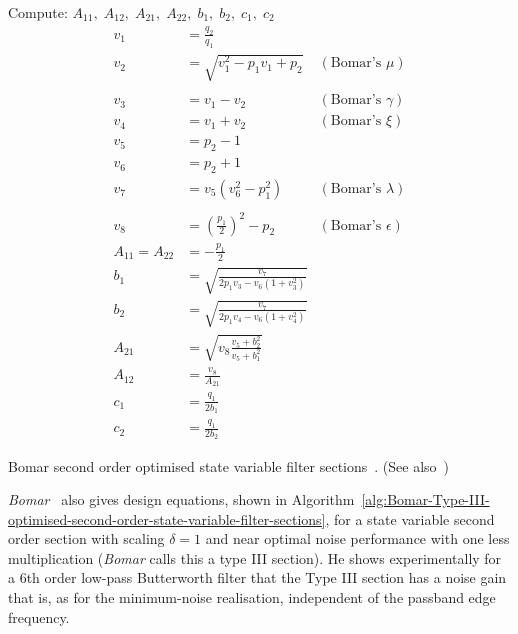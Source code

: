 \documentclass[a4paper,twoside,10pt,english]{report}
\begin{document}
\begin{algorithm}[!htpb]
Compute: $A_{11},\;A_{12},\;A_{21},\;A_{22},\;b_{1},\;b_{2},\;c_{1},\;c_{2}$
\begin{align*}
v_{1} &= \frac{q_{2}}{q_{1}}\\
v_{2} &= \sqrt{v_{1}^{2}-p_{1}v_{1}+p_{2}} & \left(\text{Bomar's }\mu\right)\\\\
v_{3} &= v_{1}-v_{2} & \left(\text{Bomar's }\gamma\right)\\
v_{4} &= v_{1}+v_{2} & \left(\text{Bomar's }\xi\right)\\
v_{5} &= p_{2}-1\\
v_{6} &= p_{2}+1\\
v_{7} &= v_{5}\left(v_{6}^{2}-p_{1}^{2}\right)
       & \left(\text{Bomar's }\lambda\right)\\\\
v_{8} &= \left(\frac{p_{1}}{2}\right)^{2}-p_{2}
      & \left(\text{Bomar's }\epsilon\right)\\
A_{11} = A_{22} &= -\frac{p_{1}}{2}\\
b_{1} &= \sqrt{\frac{v_{7}}{2p_{1}v_{3}-v_{6}\left(1+v_{3}^{2}\right)}}\\
b_{2} &= \sqrt{\frac{v_{7}}{2p_{1}v_{4}-v_{6}\left(1+v_{4}^{2}\right)}}\\
A_{21} &= \sqrt{v_{8}\frac{v_{5}+b_{2}^{2}}{v_{5}+b_{1}^{2}}}\\
A_{12} &= \frac{v_{8}}{A_{21}}\\
c_{1} &= \frac{q_{1}}{2b_{1}}\\
c_{2} &= \frac{q_{1}}{2b_{2}}
\end{align*}
\caption{Bomar second order optimised state variable filter sections~\cite[Equation 17]{Bomar_NewSecondOrderStateSpaceStructures}. (See also~\cite[Figure 9.12.1]{RobertsMullis_DigitalSignalProcessing})}
\label{alg:Bomar-optimised-second-order-state-variable-filter-sections}
\end{algorithm}

\emph{Bomar}~\cite{Bomar_NewSecondOrderStateSpaceStructures} also gives design
equations, shown in
Algorithm~\ref{alg:Bomar-Type-III-optimised-second-order-state-variable-filter-sections},
for a state variable second order section with scaling $\delta=1$ and near 
optimal noise performance with one less multiplication (\emph{Bomar} calls 
this a type III section). He shows experimentally for a $6$th order low-pass
Butterworth filter that the Type III section has a noise gain that is, as for
the minimum-noise realisation, independent of the passband edge frequency.
\end{document}
